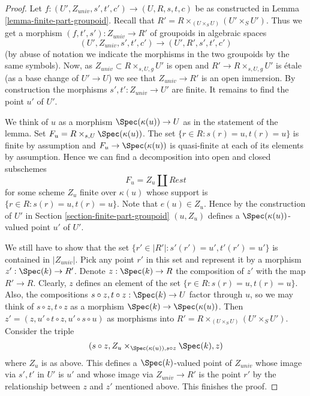 \begin{proof}
Let $f : (U', Z_{univ}, s', t', c') \to (U, R, s, t, c)$ be as constructed in
Lemma \ref{lemma-finite-part-groupoid}.
Recall that $R' = R \times_{(U \times_S U)} (U' \times_S U')$.
Thus we get a morphism $(f, t', s') : Z_{univ} \to R'$ of groupoids
in algebraic spaces
$$
(U', Z_{univ}, s', t', c') \to (U', R', s', t', c')
$$
(by abuse of notation we indicate the morphisms in the two groupoids
by the same symbols). Now, as $Z_{univ} \subset R \times_{s, U, g} U'$ is open
and $R' \to R \times_{s, U, g} U'$ is \'etale (as a base change
of $U' \to U$) we see that $Z_{univ} \to R'$ is an open immersion.
By construction the morphisms $s', t' : Z_{univ} \to U'$ are finite.
It remains to find the point $u'$ of $U'$.

\medskip\noindent
We think of $u$ as a morphism $\Spec(\kappa(u)) \to U$ as in
the statement of the lemma. Set $F_u = R \times_{s, U} \Spec(\kappa(u))$.
The set $\{r \in R : s(r) = u, t(r) = u\}$ is finite by assumption
and $F_u \to \Spec(\kappa(u))$ is quasi-finite at each
of its elements by assumption. Hence we can find a decomposition into
open and closed subschemes
$$
F_u = Z_u \amalg Rest
$$
for some scheme $Z_u$ finite over $\kappa(u)$ whose support is
$\{r \in R : s(r) = u, t(r) = u\}$. Note that $e(u) \in Z_u$.
Hence by the construction of $U'$ in
Section \ref{section-finite-part-groupoid}
$(u, Z_u)$ defines a $\Spec(\kappa(u))$-valued
point $u'$ of $U'$.

\medskip\noindent
We still have to show that the set
$\{r' \in |R'| : s'(r') = u', t'(r') = u'\}$
is contained in $|Z_{univ}|$.
Pick any point $r'$ in this set and represent it by a morphism
$z' : \Spec(k) \to R'$. Denote $z : \Spec(k) \to R$
the composition of $z'$ with the map $R' \to R$.
Clearly, $z$ defines an element of the set
$\{r \in R : s(r) = u, t(r) = u\}$.
Also, the compositions $s \circ z, t \circ z : \Spec(k) \to U$
factor through $u$, so we may think of $s \circ z, t \circ z$
as a morphism $\Spec(k) \to \Spec(\kappa(u))$. Then
$z' = (z, u' \circ t \circ z, u'\circ s \circ u)$ as morphisms into
$R' = R \times_{(U \times_S U)} (U' \times_S U')$.
Consider the triple
$$
(s \circ z, Z_u \times_{\Spec(\kappa(u)), s \circ z} \Spec(k), z)
$$
where $Z_u$ is as above. This defines a $\Spec(k)$-valued point
of $Z_{univ}$ whose image via $s', t'$ in $U'$ is $u'$ and
whose image via
$Z_{univ} \to R'$ is the point $r'$ by the relationship between
$z$ and $z'$ mentioned above.
This finishes the proof.
\end{proof}

